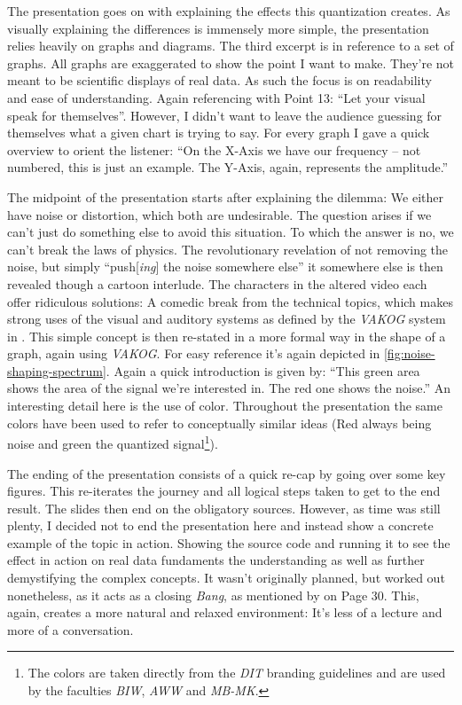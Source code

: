 The presentation goes on with explaining the effects this quantization creates.
As visually explaining the differences is immensely more simple, the presentation relies heavily on graphs and diagrams.
The third excerpt is in reference to a set of graphs.
All graphs are exaggerated to show the point I want to make.
They're not meant to be scientific displays of real data.
As such the focus is on readability and ease of understanding.
Again referencing \citeauthor{powell2011presenting} with Point 13: \enquote{Let your visual speak for themselves}\autocite[Page 8]{powell2011presenting}.
However, I didn't want to leave the audience guessing for themselves what a given chart is trying to say.
For every graph I gave a quick overview to orient the listener:
\enquote{On the X-Axis we have our frequency -- not numbered, this is just an example. The Y-Axis, again, represents the amplitude.}

The midpoint of the presentation starts after explaining the dilemma: We either have noise or distortion, which both are undesirable.
The question arises if we can't just do something else to avoid this situation.
To which the answer is no, we can't break the laws of physics.
The revolutionary revelation of not removing the noise, but simply \enquote{push{[\textit{ing}]} the noise somewhere else} it somewhere else is then revealed though a cartoon interlude.
The characters in the altered video each offer ridiculous solutions: A comedic break from the technical topics, which makes strong uses of the visual and auditory systems as defined by the \textit{VAKOG} system in \autocite[Page 77]{williams2008presentations}.
This simple concept is then re-stated in a more formal way in the shape of a graph, again using \textit{VAKOG}.
For easy reference it's again depicted in \autoref{fig:noise-shaping-spectrum}.
Again a quick introduction is given by:
\enquote{This green area shows the area of the signal we're interested in. The red one shows the noise.}
An interesting detail here is the use of color.
Throughout the presentation the same colors have been used to refer to conceptually similar ideas (Red always being noise and green the quantized signal\footnote{The colors are taken directly from the \textit{DIT} branding guidelines and are used by the faculties \textcolor{THDGreen}{\textit{BIW}}, \textcolor{THDDarkRed}{\textit{AWW}} and \textcolor{THDStrongBlue}{\textit{MB-MK}}.}).

The ending of the presentation consists of a quick re-cap by going over some key figures.
This re-iterates the journey and all logical steps taken to get to the end result.
The slides then end on the obligatory sources.
However, as time was still plenty, I decided not to end the presentation here and instead show a concrete example of the topic in action.
Showing the source code and running it to see the effect in action on real data fundaments the understanding as well as further demystifying the complex concepts.
It wasn't originally planned, but worked out nonetheless, as it acts as a closing \textit{Bang}, as mentioned by \citeauthor{williams2008presentations} on Page 30.
This, again, creates a more natural and relaxed environment:
It's less of a lecture and more of a conversation.
